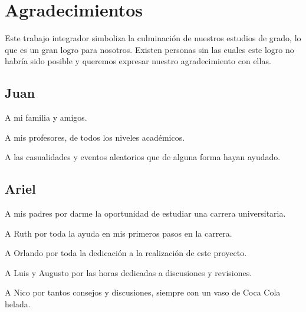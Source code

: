 \section*{Agradecimientos}
Este trabajo integrador simboliza la culminación de nuestros estudios de grado,
lo que es un gran logro para nosotros.
Existen personas sin las cuales este logro no habría sido posible y queremos
expresar nuestro agradecimiento con ellas.

\subsection*{Juan}
A mi familia y amigos.

A mis profesores, de todos los niveles académicos.

A las casualidades y eventos aleatorios que de alguna forma hayan ayudado.

 \subsection*{Ariel}
A mis padres por darme la oportunidad de estudiar una carrera universitaria.

A Ruth por toda la ayuda en mis primeros pasos en la carrera.

A Orlando por toda la dedicación a la realización de este proyecto.

A Luis y Augusto por las horas dedicadas a discusiones y revisiones.

A Nico por tantos consejos y discusiones, siempre con un vaso de Coca Cola
helada.
